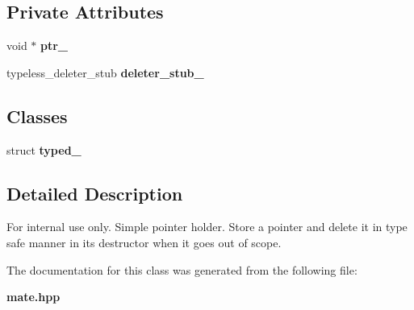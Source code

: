 \subsection*{Private Attributes}
\begin{CompactItemize}
\item 
void $\ast$ \textbf{ptr\_\-}\label{classam_1_1detail_1_1simple__ptr__holder_a917d43dc53ccd659ad5e452a06faad3}

\item 
typeless\_\-deleter\_\-stub \textbf{deleter\_\-stub\_\-}\label{classam_1_1detail_1_1simple__ptr__holder_9921d838af2d228eb1b635d6697d1569}

\end{CompactItemize}
\subsection*{Classes}
\begin{CompactItemize}
\item 
struct \textbf{typed\_\-}
\end{CompactItemize}


\subsection{Detailed Description}
\begin{Desc}
\item[For internal use only.]
Simple pointer holder. Store a pointer and delete it in type safe manner in its destructor when it goes out of scope. \end{Desc}




The documentation for this class was generated from the following file:\begin{CompactItemize}
\item 
{\bf mate.hpp}\end{CompactItemize}
